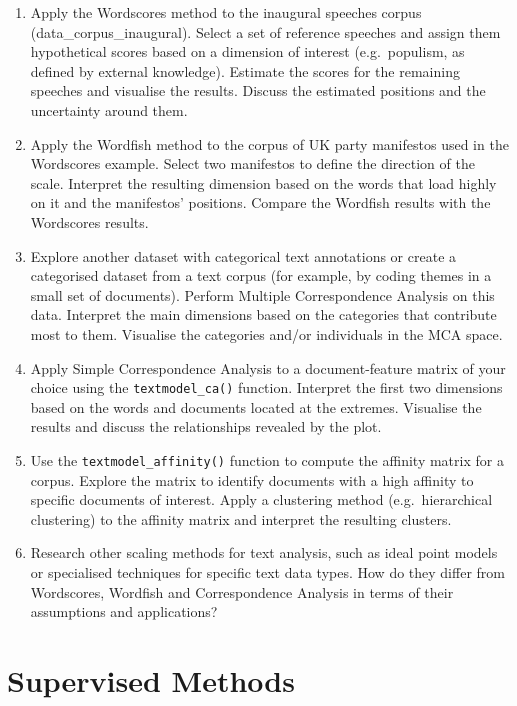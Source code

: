 \documentclass[
]{book}
\begin{document}
\begin{enumerate}
\def\labelenumi{\arabic{enumi}.}
\item
  Apply the Wordscores method to the inaugural speeches corpus (data\_corpus\_inaugural). Select a set of reference speeches and assign them hypothetical scores based on a dimension of interest (e.g.~populism, as defined by external knowledge). Estimate the scores for the remaining speeches and visualise the results. Discuss the estimated positions and the uncertainty around them.
\item
  Apply the Wordfish method to the corpus of UK party manifestos used in the Wordscores example. Select two manifestos to define the direction of the scale. Interpret the resulting dimension based on the words that load highly on it and the manifestos' positions. Compare the Wordfish results with the Wordscores results.
\item
  Explore another dataset with categorical text annotations or create a categorised dataset from a text corpus (for example, by coding themes in a small set of documents). Perform Multiple Correspondence Analysis on this data. Interpret the main dimensions based on the categories that contribute most to them. Visualise the categories and/or individuals in the MCA space.
\item
  Apply Simple Correspondence Analysis to a document-feature matrix of your choice using the \texttt{textmodel\_ca()} function. Interpret the first two dimensions based on the words and documents located at the extremes. Visualise the results and discuss the relationships revealed by the plot.
\item
  Use the \texttt{textmodel\_affinity()} function to compute the affinity matrix for a corpus. Explore the matrix to identify documents with a high affinity to specific documents of interest. Apply a clustering method (e.g.~hierarchical clustering) to the affinity matrix and interpret the resulting clusters.
\item
  Research other scaling methods for text analysis, such as ideal point models or specialised techniques for specific text data types. How do they differ from Wordscores, Wordfish and Correspondence Analysis in terms of their assumptions and applications?
\end{enumerate}

\chapter{Supervised Methods}\label{supervised-methods}
\end{document}
